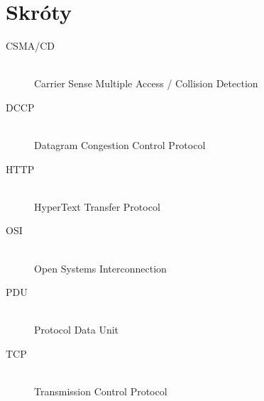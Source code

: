 \documentclass[00-praca-magisterska.tex]{subfiles}
\begin{document}
\appendix
\chapter{Skróty}

\begin{description}
  \item[CSMA/CD] \hfill \\ Carrier Sense Multiple Access / Collision Detection
  \item[DCCP] \hfill \\ Datagram Congestion Control Protocol
  \item[HTTP] \hfill \\ HyperText Transfer Protocol
  \item[OSI] \hfill \\ Open Systems Interconnection
  \item[PDU] \hfill \\ Protocol Data Unit
  \item[TCP] \hfill \\ Transmission Control Protocol
\end{description}
\end{document}
